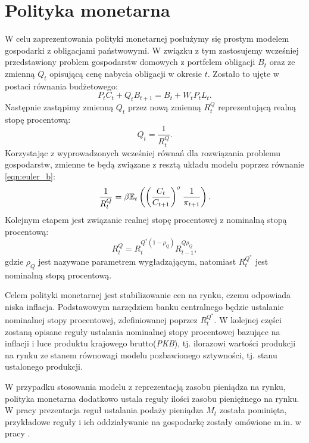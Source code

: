 \section{Polityka monetarna}
\label{sec:monetary_policy}

W celu zaprezentowania polityki monetarnej posłużymy się prostym modelem gospodarki z obligacjami państwowymi. W związku z tym zastosujemy wcześniej przedstawiony problem gospodarstw domowych z portfelem obligacji $B_t$ oraz ze zmienną $Q_t$ opisującą cenę nabycia obligacji w okresie $t$. Zostało to ujęte w postaci równania budżetowego:
\begin{equation}
    P_t C_t + Q_t B_{t+1} = B_{t} + W_t P_t L_t.
\end{equation}
Następnie zastąpimy zmienną $Q_t$ przez nową zmienną $R^Q_t$ reprezentującą realną stopę procentową:
\begin{equation}
    Q_t = \frac{1}{R^Q_t}.
\end{equation}
Korzystając z wyprowadzonych wcześniej równań dla rozwiązania problemu gospodarstw, zmienne te będą związane z resztą układu modelu poprzez równanie \eqref{eqn:euler_b}:
\begin{equation}
    \frac{1}{R^Q_t} = \beta \mathbb{E}_t \left( \left(\frac{C_t}{C_{t+1}}\right)^\sigma \frac{1}{\pi_{t+1}}\right).
\end{equation}
Kolejnym etapem jest związanie realnej stopę procentowej z nominalną stopą procentową:
\begin{equation}
    \label{eq:nominal_interest_rate}
    R^Q_t = R_t^{Q^*(1-\rho_Q)}R_{t-1}^{Q\rho_Q},
\end{equation}
gdzie $\rho_Q$ jest nazywane parametrem wygładzającym, natomiast $R^{Q^*}_t$ jest nominalną stopą procentową.

Celem polityki monetarnej jest stabilizowanie cen na rynku, czemu odpowiada niska inflacja. Podstawowym narzędziem banku centralnego będzie ustalanie nominalnej stopy procentowej, zdefiniowanej poprzez $R^{Q^*}_t$. W kolejnej części zostaną opisane reguły ustalania nominalnej stopy procentowej bazujące na inflacji i luce produktu krajowego brutto(\emph{PKB}), tj. ilorazowi wartości produkcji na rynku ze stanem równowagi modelu pozbawionego sztywności, tj. stanu ustalonego produkcji.

W przypadku stosowania modelu z reprezentacją zasobu pieniądza na rynku, polityka monetarna dodatkowo ustala reguły ilości zasobu pieniężnego na rynku. W pracy prezentacja reguł ustalania podaży pieniądza $M_t$ została pominięta, przykładowe reguły i ich oddziaływanie na gospodarkę zostały omówione m.in. w pracy \cite{gali}.


